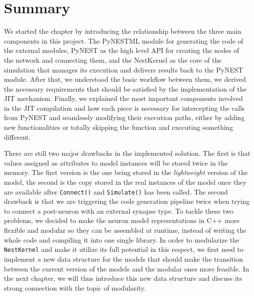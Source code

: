\section{Summary}

We started the chapter by introducing the relationship between the three main components in this project. The PyNESTML module for generating the code of the external modules, PyNEST as the high level API for creating the nodes of the network and connecting them, and the NestKernel as the core of the simulation that manages its execution and delivers results back to the PyNEST module. After that, we understood the basic workflow between them, we derived the necessary requirements that should be satisfied by the implementation of the JIT mechanism. Finally, we explained the most important components involved in the JIT compilation and how each piece is necessary for intercepting the calls from PyNEST and seamlessly modifying their execution paths, either by adding new functionalities or totally skipping the function and executing something different.

There are still two major drawbacks in the implemented solution. The first is that values assigned as attributes to model instances will be stored twice in the memory. The first version is the one being stored in the \emph{lightweight} version of the model, the second is the copy stored in the real instances of the model once they are available after \texttt{Connect()} and \texttt{Simulate()} has been called. The second drawback is that we are triggering the code generation pipeline twice when trying to connect a post-neuron with an external synapse type. To tackle these two problems, we decided to make the neuron model representations in C++ more flexible and modular so they can be assembled at runtime, instead of writing the whole code and compiling it into one single library. In order to modularize the \texttt{NestKernel} and make it utilize its full potential in this respect, we first need to implement a new data structure for the models that should make the transition between the current version of the models and the modular ones more feasible. In the next chapter, we will thus introduce this new data structure and discuss its strong connection with the topic of modularity.

\cleardoublepage

